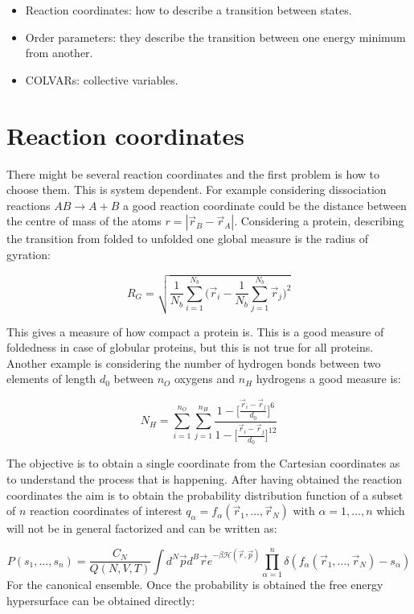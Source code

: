 	\begin{multicols}{2}
		\begin{itemize}
			\item Reaction coordinates: how to describe a transition between states.
			\item Order parameters: they describe the transition between one energy minimum from another.
			\item COLVARs: collective variables.
		\end{itemize}
	\end{multicols}

\section{Reaction coordinates}
There might be several reaction coordinates and the first problem is how to choose them.
This is system dependent.
For example considering dissociation reactions $AB\rightarrow A+B$ a good reaction coordinate could be the distance between the centre of mass of the atoms $r = |\vec{r}_B-\vec{r}_A|$.
Considering a protein, describing the transition from folded to unfolded one global measure is the radius of gyration:

$$R_G = \sqrt{\frac{1}{N_b}\sum\limits_{i=1}^{N_b}\biggl(\vec{r}_i-\frac{1}{N_b}\sum\limits_{j=1}^{N_b}\vec{r}_j\biggr)^2}$$

This gives a measure of how compact a protein is.
This is a good measure of foldedness in case of globular proteins, but this is not true for all proteins.
Another example is considering the number of hydrogen bonds between two elements of length $d_0$ between $n_O$ oxygens and $n_H$ hydrogens a good measure is:

$$N_H = \sum\limits_{i=1}^{n_O}\sum\limits_{j=1}^{n_H}\frac{1-\biggl[\frac{\vec{r}_i-\vec{r}_j}{d_0}\biggr]^6}{1-\biggl[\frac{\vec{r}_i-\vec{r}_j}{d_0}\biggr]^{12}}$$

The objective is to obtain a single coordinate from the Cartesian coordinates as to understand the process that is happening.
After having obtained the reaction coordinates the aim is to obtain the probability distribution function of a subset of $n$ reaction coordinates of interest $q_\alpha= f_\alpha(\vec{r}_1, \dots, \vec{r}_N)$ with $\alpha = 1, \dots, n$ which will not be in general factorized and can be written as:

$$P(s_1, \dots, s_n) = \frac{C_N}{Q(N, V, T)}\int d^N\vec{p}d^B\vec{r}e^{-\beta\mathcal{H}(\vec{r}, \vec{p})}\prod\limits_{\alpha=1}^n\delta(f_\alpha(\vec{r}_1, \dots, \vec{r}_N)-s_\alpha)$$
For the canonical ensemble.
Once the probability is obtained the free energy hypersurface can be obtained directly:

